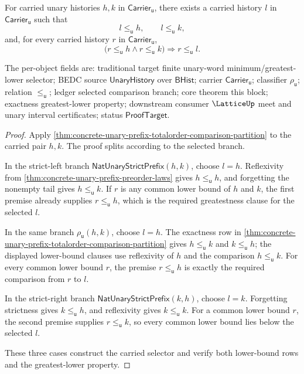 \begin{theorem}
\label{thm:totalorder-prefix-greatest-lower-selector}
For carried unary histories $h,k$ in $\mathsf{Carrier}_{\mathsf{u}}$, there
exists a carried history $l$ in $\mathsf{Carrier}_{\mathsf{u}}$ such that
$$
l\le_{\mathsf{u}}h,
\qquad
l\le_{\mathsf{u}}k,
$$
and, for every carried history $r$ in $\mathsf{Carrier}_{\mathsf{u}}$,
$$
\bigl(r\le_{\mathsf{u}}h\land r\le_{\mathsf{u}}k\bigr)
\Rightarrow r\le_{\mathsf{u}}l.
$$

The per-object fields are: traditional target finite unary-word
minimum/greatest-lower selector; BEDC source $\mathsf{UnaryHistory}$ over
$\mathsf{BHist}$; carrier $\mathsf{Carrier}_{\mathsf{u}}$; classifier
$\rho_{\mathsf{u}}$; relation $\le_{\mathsf{u}}$; ledger selected comparison
branch; core theorem this block; exactness greatest-lower property; downstream
consumer $\LatticeUp$ meet and unary interval certificates; status
$\mathsf{ProofTarget}$.
\end{theorem}
\begin{proof}
Apply
\autoref{thm:concrete-unary-prefix-totalorder-comparison-partition} to the
carried pair $h,k$. The proof splits according to the selected branch.

In the strict-left branch $\mathsf{NatUnaryStrictPrefix}(h,k)$, choose $l=h$.
Reflexivity from \autoref{thm:concrete-unary-prefix-preorder-laws} gives
$h\le_{\mathsf{u}}h$, and forgetting the nonempty tail gives
$h\le_{\mathsf{u}}k$. If $r$ is any common lower bound of $h$ and $k$, the
first premise already supplies $r\le_{\mathsf{u}}h$, which is the required
greatestness clause for the selected $l$.

In the same branch $\rho_{\mathsf{u}}(h,k)$, choose $l=h$. The exactness row in
\autoref{thm:concrete-unary-prefix-totalorder-comparison-partition} gives
$h\le_{\mathsf{u}}k$ and $k\le_{\mathsf{u}}h$; the displayed lower-bound clauses
use reflexivity of $h$ and the comparison $h\le_{\mathsf{u}}k$. For every
common lower bound $r$, the premise $r\le_{\mathsf{u}}h$ is exactly the
required comparison from $r$ to $l$.

In the strict-right branch $\mathsf{NatUnaryStrictPrefix}(k,h)$, choose $l=k$.
Forgetting strictness gives $k\le_{\mathsf{u}}h$, and reflexivity gives
$k\le_{\mathsf{u}}k$. For a common lower bound $r$, the second premise supplies
$r\le_{\mathsf{u}}k$, so every common lower bound lies below the selected $l$.

These three cases construct the carried selector and verify both lower-bound
rows and the greatest-lower property.
\end{proof}

